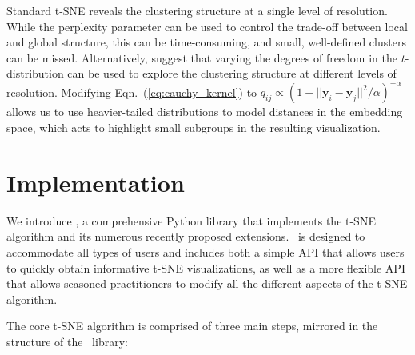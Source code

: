 \documentclass[article]{jss}
\newcommand{\opentsne}{\pkg{openTSNE}}
\begin{document}
Standard t-SNE reveals the clustering structure at a single level of resolution.
While the perplexity parameter can be used to control the trade-off between
local and global structure, this can be time-consuming, and small, well-defined
clusters can be missed. Alternatively, \citet{kobak2019heavy} suggest that
varying the degrees of freedom in the $t$-distribution can be used to explore
the clustering structure at different levels of resolution. Modifying
Eqn.~(\ref{eq:cauchy_kernel}) to $q_{ij} \propto \left ( 1 + || \mathbf{y}_i -
\mathbf{y}_j ||^2 / \alpha \right )^{-\alpha}$ allows us to use heavier-tailed
distributions to model distances in the embedding space, which acts to highlight
small subgroups in the resulting visualization.


\section{Implementation} \label{sec:implementation}

We introduce \opentsne, a comprehensive Python library that implements the t-SNE algorithm and its numerous recently proposed extensions. \opentsne\ is designed to accommodate all types of users and includes both a simple API that allows users to quickly obtain informative t-SNE visualizations, as well as a more flexible API that allows seasoned practitioners to modify all the
different aspects of the t-SNE algorithm.

The core t-SNE algorithm is comprised of three main steps, mirrored in the
structure of the \opentsne\ library:
\end{document}
